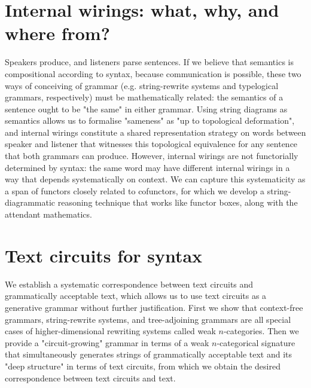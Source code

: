 \chapter{Internal wirings: what, why, and where from?}\label{chapter:internalwirings}
Speakers produce, and listeners parse sentences. If we believe that semantics is compositional according to syntax, because communication is possible, these two ways of conceiving of grammar (e.g. string-rewrite systems and typelogical grammars, respectively) must be mathematically related: the semantics of a sentence ought to be "the same" in either grammar. Using string diagrams as semantics allows us to formalise "sameness" as "up to topological deformation", and internal wirings constitute a shared representation strategy on words between speaker and listener that witnesses this topological equivalence for any sentence that both grammars can produce. However, internal wirings are not functorially determined by syntax: the same word may have different internal wirings in a way that depends systematically on context. We can capture this systematicity as a span of functors closely related to cofunctors, for which we develop a string-diagrammatic reasoning technique that works like functor boxes, along with the attendant mathematics.
\clearpage
\newpage


\chapter{Text circuits for syntax}\label{chapter:textcircuits}
We establish a systematic correspondence between text circuits and grammatically acceptable text, which allows us to use text circuits as a generative grammar without further justification. First we show that context-free grammars, string-rewrite systems, and tree-adjoining grammars are all special cases of higher-dimensional rewriting systems called weak $n$-categories. Then we provide a "circuit-growing" grammar in terms of a weak $n$-categorical signature that simultaneously generates strings of grammatically acceptable text and its "deep structure" in terms of text circuits, from which we obtain the desired correspondence between text circuits and text.
\clearpage
\newpage
\label{sec:ncat}
\clearpage
\newpage

\clearpage
\newpage

\clearpage

